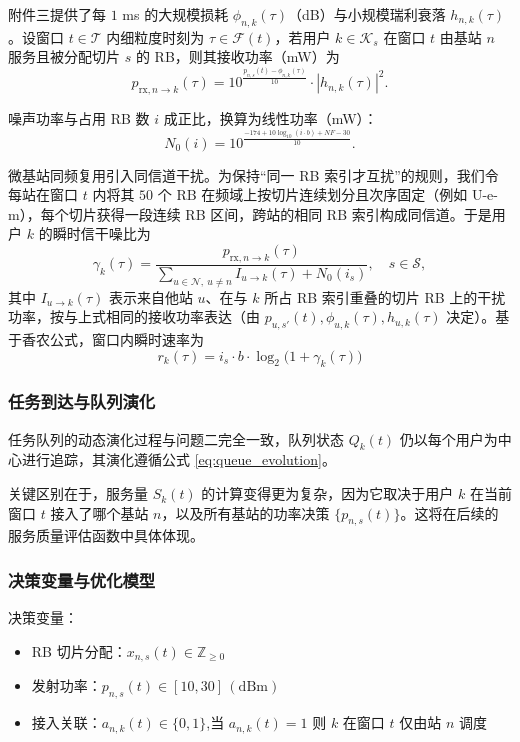 附件三提供了每 $1$ ms 的大规模损耗 $\phi_{n,k}(\tau)$（dB）与小规模瑞利衰落 $h_{n,k}(\tau)$。设窗口 $t\in\mathcal{T}$ 内细粒度时刻为 $\tau\in\mathcal{F}(t)$，若用户 $k\in\mathcal{K}_s$ 在窗口 $t$ 由基站 $n$ 服务且被分配切片 $s$ 的 RB，则其接收功率（mW）为
\begin{equation}
 p_{\mathrm{rx},n\to k}(\tau)=10^{\frac{p_{n,s}(t)-\phi_{n,k}(\tau)}{10}}\cdot |h_{n,k}(\tau)|^2.
\end{equation}

噪声功率与占用 RB 数 $i$ 成正比，换算为线性功率（mW）：
\begin{equation}
 N_0(i)=10^{\frac{-174+10\log_{10}(i\cdot b)+NF-30}{10}}.
\end{equation}

微基站同频复用引入同信道干扰。为保持“同一 RB 索引才互扰”的规则，我们令每站在窗口 $t$ 内将其 $50$ 个 RB 在频域上按切片连续划分且次序固定（例如 U-e-m），每个切片获得一段连续 RB 区间，跨站的相同 RB 索引构成同信道。于是用户 $k$ 的瞬时信干噪比为
\begin{equation}
 \gamma_k(\tau)=\frac{p_{\mathrm{rx},n\to k}(\tau)}{\sum\limits_{u\in\mathcal{N},\ u\neq n} I_{u\to k}(\tau)+N_0(i_s)},\quad s\in\mathcal{S},
\end{equation}
其中 $I_{u\to k}(\tau)$ 表示来自他站 $u$、在与 $k$ 所占 RB 索引重叠的切片 RB 上的干扰功率，按与上式相同的接收功率表达（由 $p_{u,s'}(t),\phi_{u,k}(\tau),h_{u,k}(\tau)$ 决定）。基于香农公式，窗口内瞬时速率为
\begin{equation}
 r_k(\tau)=i_s\cdot b\cdot \log_2\big(1+\gamma_k(\tau)\big)
\end{equation}
\subsubsection{任务到达与队列演化}

任务队列的动态演化过程与问题二完全一致，队列状态 $Q_k(t)$ 仍以每个用户为中心进行追踪，其演化遵循公式 \eqref{eq:queue_evolution}。

关键区别在于，服务量 $S_k(t)$ 的计算变得更为复杂，因为它取决于用户 $k$ 在当前窗口 $t$ 接入了哪个基站 $n$，以及所有基站的功率决策 $\{p_{n,s}(t)\}$。这将在后续的服务质量评估函数中具体体现。


\subsubsection{决策变量与优化模型}

决策变量：
\begin{itemize}
  \item RB 切片分配：$x_{n,s}(t)\in\mathbb{Z}_{\ge 0}$
  \item 发射功率：$p_{n,s}(t)\in[10,30]\,\mathrm{(dBm)}$
  \item 接入关联：$a_{n,k}(t)\in\{0,1\}$,当 $a_{n,k}(t)=1$ 则 $k$ 在窗口 $t$ 仅由站 $n$ 调度
\end{itemize}

